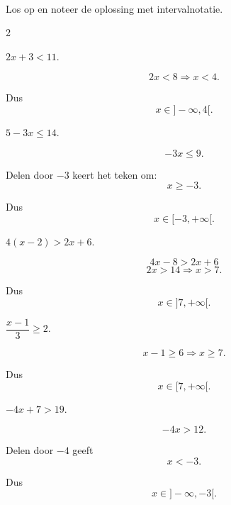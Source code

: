 \documentclass{ximera}
\begin{document}
\begin{oefening}[Eerstegraadsongelijkheden]{\oefB\ESS}
\\

Los op en noteer de oplossing met intervalnotatie.

\begin{multicols}{2}

\begin{question}
$2x+3<11$.

\begin{oplossing}
\[
2x<8
\Rightarrow x<4.
\]

Dus
\[
x\in]-\infty,4[.
\]
\end{oplossing}
\end{question}


\begin{question}
$5-3x\leq14$.

\begin{oplossing}
\[
-3x\leq9.
\]

Delen door $-3$ keert het teken om:
\[
x\geq-3.
\]

Dus
\[
x\in[-3,+\infty[.
\]
\end{oplossing}
\end{question}


\begin{question}
$4(x-2)>2x+6$.

\begin{oplossing}
\[
4x-8>2x+6
\]
\[
2x>14
\Rightarrow x>7.
\]

Dus
\[
x\in]7,+\infty[.
\]
\end{oplossing}
\end{question}


\begin{question}
$\dfrac{x-1}{3}\geq2$.

\begin{oplossing}
\[
x-1\geq6
\Rightarrow x\geq7.
\]

Dus
\[
x\in[7,+\infty[.
\]
\end{oplossing}
\end{question}


\begin{question}
$-4x+7>19$.

\begin{oplossing}
\[
-4x>12.
\]

Delen door $-4$ geeft
\[
x<-3.
\]

Dus
\[
x\in]-\infty,-3[.
\]
\end{oplossing}
\end{question}



\end{multicols}
\end{oefening}
\end{document}
